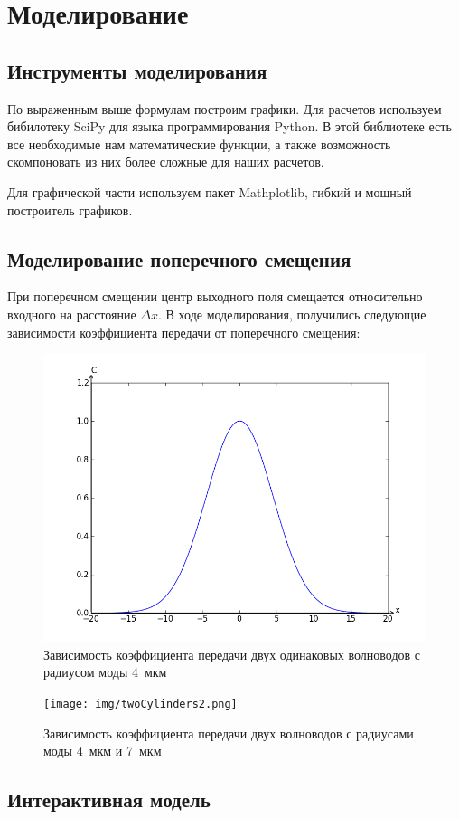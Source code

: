 \chapter{Моделирование}
\section{Инструменты моделирования}

По выраженным выше формулам построим графики. Для расчетов используем бибилотеку SciPy для языка программирования Python. В этой библиотеке есть все необходимые нам математические функции, а также возможность скомпоновать из них более сложные для наших расчетов.

Для графической части используем пакет Mathplotlib, гибкий и мощный построитель графиков. 

\section{Моделирование поперечного смещения}

При поперечном смещении центр выходного поля смещается относительно входного на расстояние $\Delta x$. В ходе моделирования, получились следующие зависимости коэффициента передачи от поперечного смещения:

\begin{figure}[h!]
		\includegraphics[width=0.5\linewidth]{img/twoCylinders.png}
		\caption{Зависимость коэффициента передачи двух одинаковых волноводов с радиусом моды 4~мкм}
\end{figure}
\begin{figure}[h!]
		\texttt{[image: img/twoCylinders2.png]}
		\caption{Зависимость коэффициента передачи двух волноводов с радиусами моды 4~мкм и 7~мкм}
\end{figure}

\newpage
\section{Интерактивная модель}

